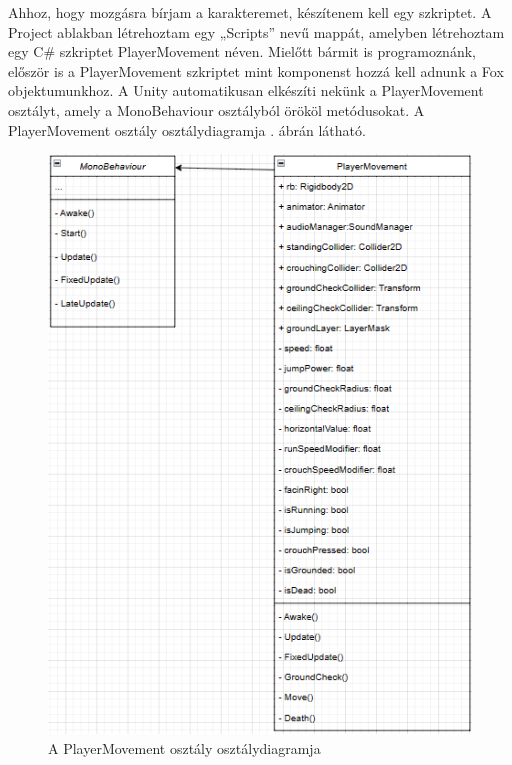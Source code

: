 Ahhoz, hogy mozgásra bírjam a karakteremet, készítenem kell egy szkriptet. A Project ablakban létrehoztam egy „Scripts” nevű mappát, amelyben létrehoztam egy C\# szkriptet PlayerMovement néven. Mielőtt bármit is programoznánk, először is a PlayerMovement szkriptet mint komponenst hozzá kell adnunk a Fox objektumunkhoz. A Unity automatikusan elkészíti nekünk a PlayerMovement osztályt, amely a MonoBehaviour osztályból örököl metódusokat. A PlayerMovement osztály osztálydiagramja . ábrán látható. 

\begin{figure}[ht]
\centering
\includegraphics[scale = 0.5]{images/playerclass.png}
\caption{A PlayerMovement osztály osztálydiagramja}
\label{fig:playermovementclass}
\end{figure}

